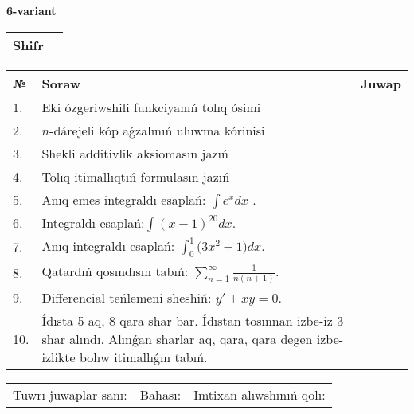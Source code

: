 \documentclass{article}
\begin{document}
  \egroup
  
  \newpage
  
  
  \textbf{6-variant}\\
  
  \bgroup
  \def\arraystretch{1.6} %
  
  \begin{tabular}{|m{5.7cm}|m{9.5cm}|}
  \hline
  Shifr & \\
  \hline
  \end{tabular}
  
  \vspace{1cm}
  
  \begin{tabular}{|m{0.7cm}|m{10cm}|m{4cm}|}
  \hline
  № & Soraw & Juwap \\
  \hline
  1. & Eki ózgeriwshili funkciyanıń tolıq ósimi &  \\
  \hline
  2. & \(n\)-dárejeli kóp aǵzalınıń uluwma kórinisi &  \\
  \hline
  3. & Shekli additivlik aksiomasın jazıń &  \\
  \hline
  4. & Tolıq itimallıqtıń formulasın jazıń &  \\
  \hline
  5. & Anıq emes integraldı esaplań: \(\int{e^{x}dx}\) . &  \\
  \hline
  6. & Integraldı esaplań:\(\int{(x - 1)^{20}}dx\). &  \\
  \hline
  7. & Anıq integraldı esaplań: \(\int_{0}^{1}{(3x^2 } + 1)dx\). &  \\
  \hline
  8. & Qatardıń qosındısın tabıń: \(\sum_{n = 1}^{\infty}\frac{1}{n(n + 1)}\). &  \\
  \hline
  9. & Differencial teńlemeni sheshiń: \(y' + xy = 0\). &  \\
  \hline
  10. & Ídısta 5 aq, 8 qara shar bar. Ídıstan tosınnan izbe-iz 3 shar alındı. Alınǵan sharlar aq, qara, qara degen izbe-izlikte bolıw itimallıǵın tabıń. &  \\
  \hline
  \end{tabular}
  
  \vspace{1cm}
  
  \begin{tabular}{lll}
  Tuwrı juwaplar sanı: \underline{\hspace{1.5cm}} & 
  Bahası: \underline{\hspace{1.5cm}} & 
  Imtixan alıwshınıń qolı: \underline{\hspace{2cm}} \\
  \end{tabular}
  
\end{document}

